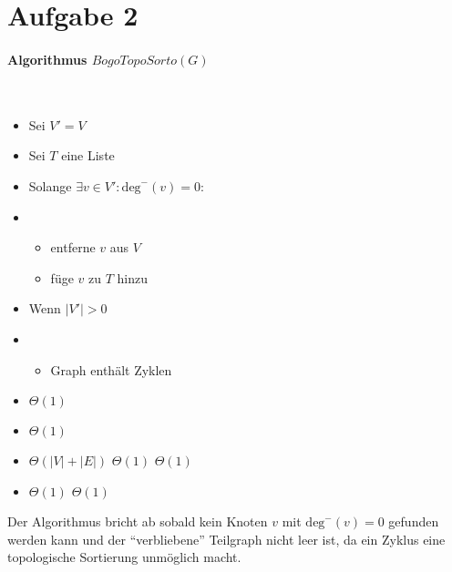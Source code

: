 \section*{Aufgabe 2}
\paragraph{Algorithmus $BogoTopoSorto(G)$} ~\\[0.5cm]
\begin{minipage}[t]{0.7\textwidth}
    \begin{itemize}[noitemsep]
        \item Sei $V' = V$
        \item Sei $T$ eine Liste
        \item Solange $\exists v \in V': \mathrm{deg}^-(v) = 0$: 
        \item[] \begin{itemize}[nolistsep, noitemsep]
            \item entferne $v$ aus $V$
            \item füge $v$ zu $T$ hinzu
        \end{itemize}
        \item Wenn $|V'| > 0$
        \item[] \begin{itemize}[nolistsep, noitemsep]
            \item Graph enthält Zyklen
        \end{itemize}
    \end{itemize}
\end{minipage}
%
\begin{minipage}[t]{0.3\textwidth}
	\begin{itemize}[noitemsep]
    	\item[] $\Theta(1)$
    	\item[] $\Theta(1)$
    	\item[] $\Theta(|V| + |E|)$
    	\subitem $\Theta(1)$
    	\subitem $\Theta(1)$
    	\item[] $\Theta(1)$
    	\subitem $\Theta(1)$
    \end{itemize}
\end{minipage}

\vspace{0.5cm}

Der Algorithmus bricht ab sobald kein Knoten $v$ mit $\mathrm{deg}^-(v) = 0$ gefunden werden kann und der \enquote{verbliebene} Teilgraph nicht leer ist, da ein Zyklus eine topologische Sortierung unmöglich macht. 